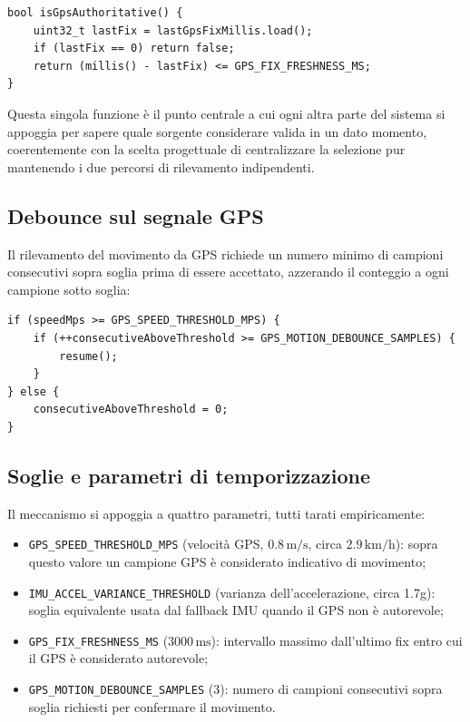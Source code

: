 \begin{listing}[H]
\begin{verbatim}
bool isGpsAuthoritative() {
    uint32_t lastFix = lastGpsFixMillis.load();
    if (lastFix == 0) return false;
    return (millis() - lastFix) <= GPS_FIX_FRESHNESS_MS;
}
\end{verbatim}
\caption{Determinazione della sorgente autorevole}
\label{listing:gps-authoritative}
\end{listing}

Questa singola funzione è il punto centrale a cui ogni altra parte del
sistema si appoggia per sapere quale sorgente considerare valida in un dato
momento, coerentemente con la scelta progettuale di centralizzare la
selezione pur mantenendo i due percorsi di rilevamento indipendenti.

\subsection{Debounce sul segnale GPS}
Il rilevamento del movimento da GPS richiede un numero minimo di campioni
consecutivi sopra soglia prima di essere accettato, azzerando il conteggio a
ogni campione sotto soglia:

\begin{listing}[H]
\begin{verbatim}
if (speedMps >= GPS_SPEED_THRESHOLD_MPS) {
    if (++consecutiveAboveThreshold >= GPS_MOTION_DEBOUNCE_SAMPLES) {
        resume();
    }
} else {
    consecutiveAboveThreshold = 0;
}
\end{verbatim}
\caption{Debounce del segnale di movimento GPS (semplificato)}
\label{listing:gps-debounce}
\end{listing}

\subsection{Soglie e parametri di temporizzazione}
Il meccanismo si appoggia a quattro parametri, tutti tarati empiricamente: 
\begin{itemize}
    \item \texttt{GPS\_SPEED\_THRESHOLD\_MPS} (velocità GPS, $0.8\,\text{m/s}$, circa
        $2.9\,\text{km/h}$): sopra questo valore un campione GPS è considerato indicativo di movimento;
    \item \texttt{IMU\_ACCEL\_VARIANCE\_THRESHOLD} (varianza
        dell'accelerazione, circa 1.7g): soglia equivalente usata dal fallback IMU quando il GPS non è autorevole;
    \item \texttt{GPS\_FIX\_FRESHNESS\_MS} ($3000\,\text{ms}$): intervallo massimo dall'ultimo fix entro cui
    il GPS è considerato autorevole;
    \item \texttt{GPS\_MOTION\_DEBOUNCE\_SAMPLES} (3): numero di campioni consecutivi sopra soglia 
    richiesti per confermare il movimento.
\end{itemize}


